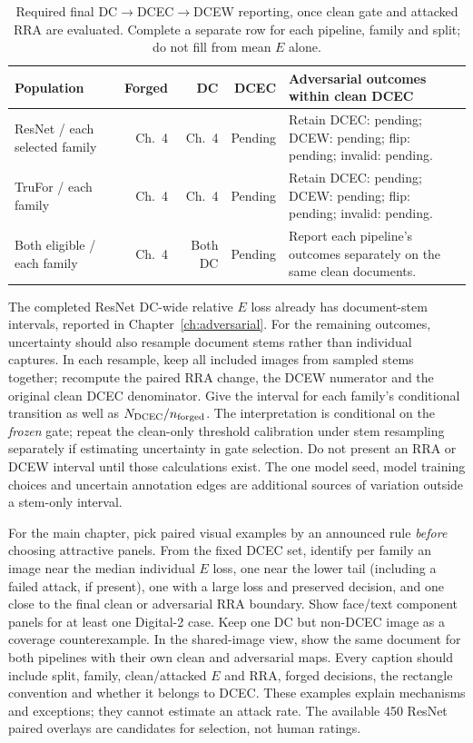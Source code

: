 \begin{table}[htbp]
\centering\small
\caption{Required final DC$\rightarrow$DCEC$\rightarrow$DCEW reporting, once clean gate and attacked RRA are evaluated. Complete a separate row for each pipeline, family and split; do not fill from mean $E$ alone.}
\label{tab:app-adv-final-fill}
\begin{tabularx}{\textwidth}{@{}>{\raggedright\arraybackslash}p{}rrr>{\raggedright\arraybackslash}X@{}}
\toprule
Population & Forged & DC & DCEC & Adversarial outcomes within clean DCEC \\
\midrule
ResNet / each selected family & Ch.~4 & Ch.~4 & Pending & Retain DCEC: pending; DCEW: pending; flip: pending; invalid: pending. \\
TruFor / each family & Ch.~4 & Ch.~4 & Pending & Retain DCEC: pending; DCEW: pending; flip: pending; invalid: pending. \\
Both eligible / each family & Ch.~4 & Both DC & Pending & Report each pipeline's outcomes separately on the same clean documents. \\
\bottomrule
\end{tabularx}
\end{table}

The completed ResNet DC-wide relative $E$ loss already has document-stem intervals, reported in Chapter~\ref{ch:adversarial}. For the remaining outcomes, uncertainty should also resample document stems rather than individual captures. In each resample, keep all included images from sampled stems together; recompute the paired RRA change, the DCEW numerator and the original clean DCEC denominator. Give the interval for each family's conditional transition as well as $N_{\rm DCEC}/n_{\rm forged}$. The interpretation is conditional on the \emph{frozen} gate; repeat the clean-only threshold calibration under stem resampling separately if estimating uncertainty in gate selection. Do not present an RRA or DCEW interval until those calculations exist. The one model seed, model training choices and uncertain annotation edges are additional sources of variation outside a stem-only interval.

For the main chapter, pick paired visual examples by an announced rule \emph{before} choosing attractive panels. From the fixed DCEC set, identify per family an image near the median individual $E$ loss, one near the lower tail (including a failed attack, if present), one with a large loss and preserved decision, and one close to the final clean or adversarial RRA boundary. Show face/text component panels for at least one Digital-2 case. Keep one DC but non-DCEC image as a coverage counterexample. In the shared-image view, show the same document for both pipelines with their own clean and adversarial maps. Every caption should include split, family, clean/attacked $E$ and RRA, forged decisions, the rectangle convention and whether it belongs to DCEC. These examples explain mechanisms and exceptions; they cannot estimate an attack rate. The available 450 ResNet paired overlays are candidates for selection, not human ratings.

